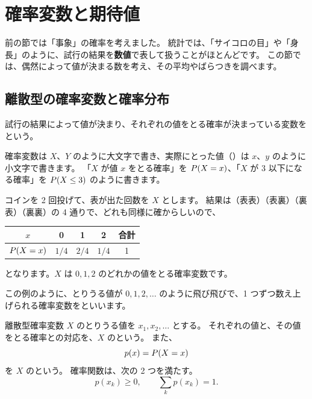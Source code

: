 \section{確率変数と期待値}
\label{sec:stat-random-variable}

前の節では「事象」の確率を考えました。
統計では、「サイコロの目」や「身長」のように、試行の結果を\textbf{数値}で表して扱うことがほとんどです。
この節では、偶然によって値が決まる数を考え、その平均やばらつきを調べます。

\subsection{離散型の確率変数と確率分布}

\begin{definition}
  試行の結果によって値が決まり、それぞれの値をとる確率が決まっている変数をという。
\end{definition}

確率変数は $X$、$Y$ のように大文字で書き、実際にとった値（）は $x$、$y$ のように小文字で書きます。
「$X$ が値 $x$ をとる確率」を $P(X = x)$、「$X$ が $3$ 以下になる確率」を $P(X \le 3)$ のように書きます。

\begin{example}[コインの表の枚数][ex:coin-rv]
  コインを 2 回投げて、表が出た回数を $X$ とします。
  結果は（表表）（表裏）（裏表）（裏裏）の 4 通りで、どれも同様に確からしいので、
  \begin{center}
    \begin{tabular}{c|ccc|c}
      \toprule
      $x$ & 0 & 1 & 2 & 合計 \\
      \midrule
      $P(X = x)$ & $1/4$ & $2/4$ & $1/4$ & 1 \\
      \bottomrule
    \end{tabular}
  \end{center}
  となります。$X$ は $0, 1, 2$ のどれかの値をとる確率変数です。
\end{example}

この例のように、とりうる値が $0, 1, 2, \dots$ のように飛び飛びで、1 つずつ数え上げられる確率変数をといいます。

\begin{definition}
  離散型確率変数 $X$ のとりうる値を $x_1, x_2, \dots$ とする。
  それぞれの値と、その値をとる確率との対応を、$X$ のという。
  また、
  \[
    p(x) = P(X = x)
  \]
  を $X$ のという。
  確率関数は、次の 2 つを満たす。
  \[
    p(x_k) \ge 0, \qquad \sum_{k} p(x_k) = 1.
  \]
\end{definition}

